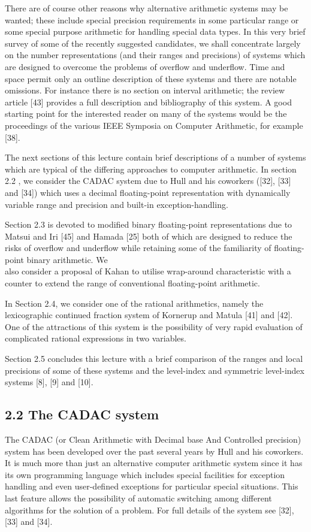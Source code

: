 \documentclass[10pt]{article}
\begin{document}
There are of course other reasons why alternative arithmetic systems may be wanted; these include special precision requirements in some particular range or some special purpose arithmetic for handling special data types. In this very brief survey of some of the recently suggested candidates, we shall concentrate largely on the number representations (and their ranges and precisions) of systems which are designed to overcome the problems of overflow and underflow. Time and space permit only an outline description of these systems and there are notable omissions. For instance there is no section on interval arithmetic; the review article [43] provides a full description and bibliography of this system. A good starting point for the interested reader on many of the systems would be the proceedings of the various IEEE Symposia on Computer Arithmetic, for example [38].

The next sections of this lecture contain brief descriptions of a number of systems which are typical of the differing approaches to computer arithmetic. In section 2.2 , we consider the CADAC system due to Hull and his coworkers ([32], [33] and [34]) which uses a decimal floating-point representation with dynamically variable range and precision and built-in exception-handling.

Section 2.3 is devoted to modified binary floating-point representations due to Matsui and Iri [45] and Hamada [25] both of which are designed to reduce the risks of overflow and underflow while retaining some of the familiarity of floating-point binary arithmetic. We\\
also consider a proposal of Kahan to utilise wrap-around characteristic with a counter to extend the range of conventional floating-point arithmetic.

In Section 2.4, we consider one of the rational arithmetics, namely the lexicographic continued fraction system of Kornerup and Matula [41] and [42]. One of the attractions of this system is the possibility of very rapid evaluation of complicated rational expressions in two variables.

Section 2.5 concludes this lecture with a brief comparison of the ranges and local precisions of some of these systems and the level-index and symmetric level-index systems [8], [9] and [10].

\subsection*{2.2 The CADAC system}
The CADAC (or Clean Arithmetic with Decimal base And Controlled precision) system has been developed over the past several years by Hull and his coworkers. It is much more than just an alternative computer arithmetic system since it has its own programming language which includes special facilities for exception handling and even user-defined exceptions for particular special situations. This last feature allows the possibility of automatic switching among different algorithms for the solution of a problem. For full details of the system see [32], [33] and [34].
\end{document}
